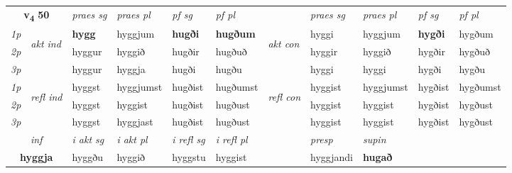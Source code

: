 \noindent
\begin{tabular}{lllllllllll} \toprule
\multicolumn{2}{c}{\textbf{v{\textsubscript{4}}} \Large{\textbf{50}}}  &  \textit{praes sg}  & \textit{praes pl}  &\textit{ pf sg} & \textit{pf pl} &  &  \textit{praes sg}  & \textit{praes pl}  & \textit{pf sg} & \textit{pf pl } \\*
	\cmidrule{3-6} \cmidrule{8-11}
 {\textit{1p}} & \multirow{3}{*}{\begin{turn}{90}\textit{akt ind}\end{turn}} & \textbf{hygg} & hyggjum & \textbf{hugði} & \textbf{hugðum} & \multirow{3}{*}{\begin{turn}{90}\textit{akt con}\end{turn}} &hyggi & hyggjum & \textbf{hygði} & hygðum\\*
 {\textit{2p}} &  &  hyggur  & hyggið & hugðir & hugðuð & & hyggir & hyggið & hygðir & hygðuð \\*
{\textit{3p}} &  & hyggur & hyggja & hugði & hugðu & & hyggi & hyggi& hygði & hygðu \\*
\cmidrule{3-6} \cmidrule{8-11}
 {\textit{1p}} & \multirow{3}{*}{\begin{turn}{90}\textit{refl ind}\end{turn}}  & hyggst & hyggjumst & hugðist & hugðumst & \multirow{3}{*}{\begin{turn}{90}\textit{refl con}\end{turn}}  &hyggist & hyggjumst & hygðist & hygðumst \\*
 {\textit{2p}} &  & hyggst & hyggist & hugðist & hugðust & &hyggist & hyggist & hygðist & hygðust \\*
 {\textit{3p}}  & & hyggst & hyggjast & hugðist & hugðust & & hyggist & hyggist& hygðist & hygðust \\*
\cmidrule{3-6} \cmidrule{8-11}

   \multicolumn{2}{c}{\textit{inf}}  & \textit{i akt sg} & \textit{i akt pl} & \textit{i refl sg} & \textit{i refl pl} && \textit{presp} & \textit{supin}   \\*
  \multicolumn{2}{c}{\textbf{hyggja}} & hyggðu  & hyggið & hyggstu & hyggist && hyggjandi &  \textbf{hugað}   \\*
\end{tabular}

